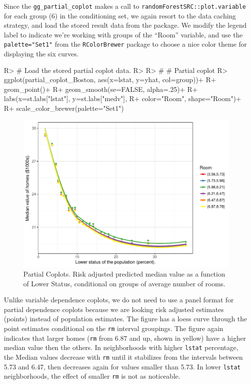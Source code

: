 \documentclass[article]{jss}
\begin{document}
Since the \texttt{gg\_partial\_coplot} makes a call to
\texttt{randomForestSRC::plot.variable} for each group (6) in the
conditioning set, we again resort to the data caching strategy, and load
the stored result data from the  package. We modify
the legend label to indicate we're working with groups of the ``Room''
variable, and use the \texttt{palette="Set1"} from the
\texttt{RColorBrewer} package \citep{rcolorbrewer:2014} to choose a nice
color theme for displaying the six curves.

\begin{CodeChunk}

\begin{CodeInput}
R> # Load the stored partial coplot data.
R> 
R> # # Partial coplot
R> ggplot(partial_coplot_Boston, aes(x=lstat, y=yhat, col=group))+
R+   geom_point()+
R+   geom_smooth(se=FALSE, alpha=.25)+
R+   labs(x=st.labs["lstat"], y=st.labs["medv"],
R+        color="Room", shape="Room")+
R+   scale_color_brewer(palette="Set1")
\end{CodeInput}
\begin{figure}

{\centering \includegraphics{Regression-rfsrc_files/figure-latex/prtl-coplots-1} 

}

\caption[Partial Coplots]{Partial Coplots. Risk adjusted predicted median value as a function of Lower Status, conditional on groups of average number of rooms.}\label{fig:prtl-coplots}
\end{figure}
\end{CodeChunk}

Unlike variable dependence coplots, we do not need to use a panel format
for partial dependence coplots because we are looking risk adjusted
estimates (points) instead of population estimates. The figure has a
loess curve through the point estimates conditional on the \texttt{rm}
interval groupings. The figure again indicates that larger homes
(\texttt{rm} from 6.87 and up, shown in yellow) have a higher median
value then the others. In neighborhoods with higher \texttt{lstat}
percentage, the Median values decrease with \texttt{rm} until it
stabilizes from the intervals between 5.73 and 6.47, then decreases
again for values smaller than 5.73. In lower \texttt{lstat}
neighborhoods, the effect of smaller \texttt{rm} is not as noticeable.
\end{document}
